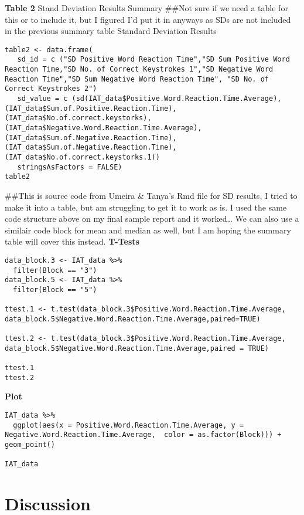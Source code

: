 \documentclass[11pt]{article}
\begin{document}
\textbf{Table 2}
Stand Deviation Results Summary
\#\#Not sure if we need a table for this or to include it, but I figured I'd put it in anyways as SDs are not included in the previous summary table
Standard Deviation Results
\begin{verbatim}
table2 <- data.frame(
   sd_id = c ("SD Positive Word Reaction Time","SD Sum Positive Word Reaction Time,"SD No. of Correct Keystrokes 1","SD Negative Word Reaction Time","SD Sum Negative Word Reaction Time", "SD No. of Correct Keystrokes 2")
   sd_value = c (sd(IAT_data$Positive.Word.Reaction.Time.Average),(IAT_data$Sum.of.Positive.Reaction.Time),(IAT_data$No.of.correct.keystorks),(IAT_data$Negative.Word.Reaction.Time.Average),(IAT_data$Sum.of.Negative.Reaction.Time),(IAT_data$Sum.of.Negative.Reaction.Time),(IAT_data$No.of.correct.keystorks.1))
   stringsAsFactors = FALSE)
table2
\end{verbatim}

\#\#This is source code from Umeira \& Tanya's Rmd file for SD results, I tried to make it into a table, but am struggling to get it to work as is. I used the same code structure above on my final sample report and it worked\ldots{} We can also use a similair code block for mean and median as well, but I am hoping the summary table will cover this instead.
\textbf{T-Tests}
\begin{verbatim}
data_block.3 <- IAT_data %>%
  filter(Block == "3")
data_block.5 <- IAT_data %>%
  filter(Block == "5")

ttest.1 <- t.test(data_block.3$Positive.Word.Reaction.Time.Average, data_block.5$Negative.Word.Reaction.Time.Average,paired=TRUE)

ttest.2 <- t.test(data_block.3$Positive.Word.Reaction.Time.Average, data_block.5$Negative.Word.Reaction.Time.Average,paired = TRUE)

ttest.1
ttest.2
\end{verbatim}

\textbf{Plot}
\begin{verbatim}
IAT_data %>%
  ggplot(aes(x = Positive.Word.Reaction.Time.Average, y = Negative.Word.Reaction.Time.Average,  color = as.factor(Block))) + geom_point()

IAT_data
\end{verbatim}

\section{Discussion}
\label{sec:orgfc0ac9b}
\end{document}

